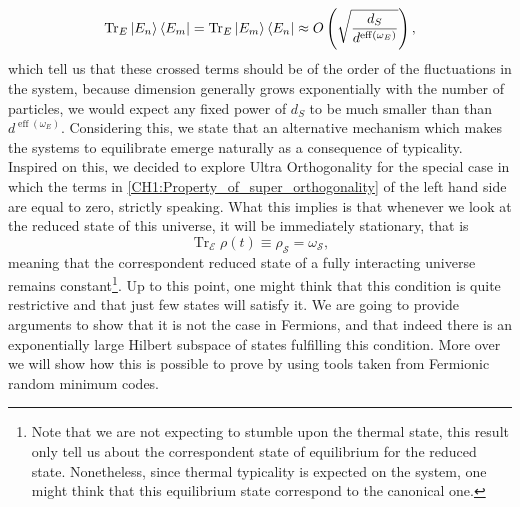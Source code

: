 \begin{equation}
\operatorname{Tr}_E \mathinner{|{E_n}\rangle}\mathinner{\langle{E_m}|} = \operatorname{Tr}_E \mathinner{|{E_m}\rangle}\mathinner{\langle{E_n}|} \approx O\left(\sqrt{\frac{d_S}{d^{\operatorname{eff}(\omega_E)}}}\right),
\label{CH1:Property_of_super_orthogonality}
\end{equation}
which tell us that these crossed terms should be of the order of the fluctuations in the system, because dimension generally grows exponentially with the number of particles, we would expect any fixed power of $d_{S}$ to be much smaller than than $d^{\operatorname{eff}(\omega_E)}$. Considering this, we state that an alternative mechanism which makes the systems to equilibrate emerge naturally as a consequence of typicality.\\

\indent Inspired on this, we decided to explore Ultra Orthogonality for the special case in which the terms in \eqref{CH1:Property_of_super_orthogonality} of the left hand side are equal to zero, strictly speaking. What this implies is that whenever we look at the reduced state of this universe, it will be immediately stationary, that is
\begin{equation}
\operatorname{Tr}_{\mathcal{E}}\rho(t)\equiv \rho_{\mathcal{S}} = \omega_{\mathcal{S}},
\end{equation}
meaning that the correspondent reduced state of a fully interacting universe remains constant\footnote{Note that we are not expecting to stumble upon the thermal state, this result only tell us about the correspondent state of equilibrium for the reduced state. Nonetheless, since thermal typicality is expected on the system, one might think that this equilibrium state correspond to the canonical one. }. Up to this point, one might think that this condition is quite restrictive and that just few states will satisfy it. We are going to provide arguments to show that it is not the case in Fermions, and that indeed there is an exponentially large Hilbert subspace of states fulfilling this condition. More over we will show how this is possible to prove by using tools taken from Fermionic random minimum codes.

